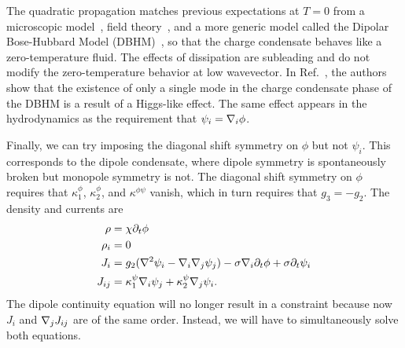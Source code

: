 The quadratic propagation matches previous expectations at $T=0$ from a microscopic model~\cite{Yuan2020Fractonic}, field theory~\cite{Stahl2022Spontaneous}, and a more generic model called the Dipolar Bose-Hubbard Model (DBHM)~\cite{Lake2022Dipolar}, so that the charge condensate behaves like a zero-temperature fluid. The effects of dissipation are subleading and do not modify the zero-temperature behavior at low wavevector. In Ref.~\cite{Lake2022Dipolar}, the authors show that the existence of only a single mode in the charge condensate phase of the DBHM is a result of a Higgs-like effect. The same effect appears in the hydrodynamics as the requirement that $\psi_i = \nabla_i\phi$.

Finally, we can try imposing the diagonal shift symmetry on $\phi$ but not $\psi_i$. This corresponds to the dipole condensate, where dipole symmetry is spontaneously broken but monopole symmetry is not. The diagonal shift symmetry on $\phi$ requires that $\kappa^\phi_1$, $\kappa^\phi_2$, and $\kappa^{\phi\psi}$ vanish, which in turn requires that $g_3=-g_2$.
The density and currents are
\begin{align}
\rho &= \chi\partial_t \phi \nonumber\\
\rho_i &= 0 \nonumber\\
J_i &= g_2 (\nabla^2\psi_i - \nabla_i\nabla_j\psi_j) - \sigma \nabla_i \partial_t\phi + \sigma \partial_t\psi_i \nonumber\\
J_{ij} &= \kappa^\psi_1 \nabla_i \psi_j + \kappa^\psi_2 \nabla_j  \psi_i. \label{eqn:dc-currents}
\end{align}
The dipole continuity equation will no longer result in a constraint because now $J_i$ and $\nabla_jJ_{ij}$ are of the same order. Instead, we will have to simultaneously solve both equations. 

